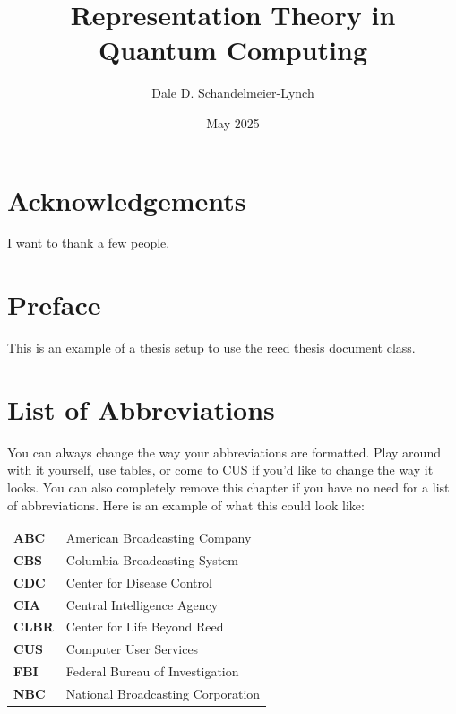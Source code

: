 \documentclass[12pt,twoside]{reedthesis}
\title{Representation Theory in Quantum Computing}
\author{Dale D. Schandelmeier-Lynch}
\date{May 2025}
\theoremstyle{plain}   %
\theoremstyle{definition}
\theoremstyle{remark}
\numberwithin{equation}{section}
\begin{document}
  \maketitle
  \frontmatter %
  \pagestyle{empty} %

    \chapter*{Acknowledgements}
	I want to thank a few people.

    \chapter*{Preface}
	This is an example of a thesis setup to use the reed thesis document class.
	
	

    \chapter*{List of Abbreviations}
		You can always change the way your abbreviations are formatted. Play around with it yourself, use tables, or come to CUS if you'd like to change the way it looks. You can also completely remove this chapter if you have no need for a list of abbreviations. Here is an example of what this could look like:

	\begin{table}[h]
	\centering %
	\begin{tabular}{ll}
		\textbf{ABC}  	&  American Broadcasting Company \\
		\textbf{CBS}  	&  Columbia Broadcasting System\\
		\textbf{CDC}  	&  Center for Disease Control \\
		\textbf{CIA}  	&  Central Intelligence Agency\\
		\textbf{CLBR} 	&  Center for Life Beyond Reed\\
		\textbf{CUS}  	&  Computer User Services\\
		\textbf{FBI}  	&  Federal Bureau of Investigation\\
		\textbf{NBC}  	&  National Broadcasting Corporation\\
	\end{tabular}
	\end{table}
	
\end{document}
